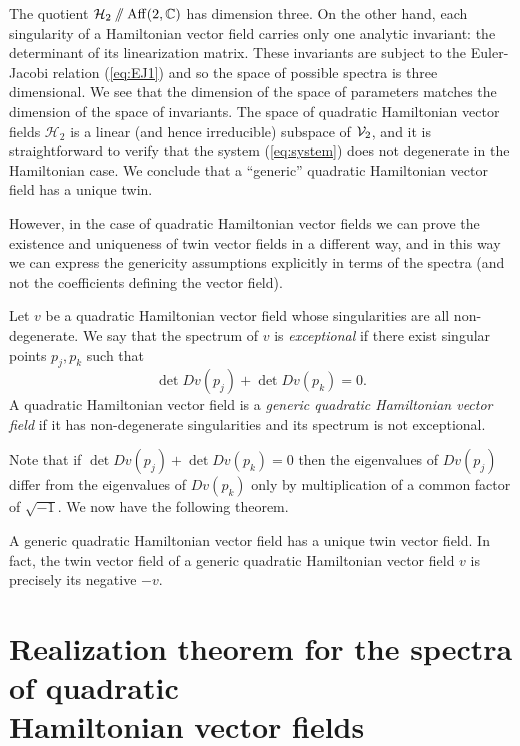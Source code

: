 \documentclass[phd,tocprelim]{cornell}
\begin{document}
The quotient $\mathcal{H}_2\sslash\operatorname{Aff}({2},{\mathbb{C}})$ has dimension three. On the other hand, each singularity of a Hamiltonian vector field carries only one analytic invariant: the determinant of its linearization matrix. These invariants are subject to the Euler-Jacobi relation (\ref{eq:EJ1}) and so the space of possible spectra is three dimensional. We see that the dimension of the space of parameters matches the dimension of the space of invariants. The space of quadratic Hamiltonian vector fields $\mathcal{H}_2$ is a linear (and hence irreducible) subspace of $\mathcal{V}_2$, and it is straightforward to verify that the system (\ref{eq:system}) does not degenerate in the Hamiltonian case. We conclude that a ``generic'' quadratic Hamiltonian vector field has a unique twin.

However, in the case of quadratic Hamiltonian vector fields we can prove the existence and uniqueness of twin vector fields in a different way, and in this way we can express the genericity assumptions explicitly in terms of the spectra (and not the coefficients defining the vector field).

\begin{definition}
Let $v$ be a quadratic Hamiltonian vector field whose singularities are all non-degenerate. We say that the spectrum of $v$ is \emph{exceptional} if there exist singular points $p_j,p_k$ such that
\[ \det{Dv(p_j)}+\det{Dv(p_k)}=0. \]
A quadratic Hamiltonian vector field is a \emph{generic quadratic Hamiltonian vector field} if it has non-degenerate singularities and its spectrum is not exceptional.
\end{definition}

Note that if $\det{Dv(p_j)}+\det{Dv(p_k)}=0$ then the eigenvalues of $Dv(p_j)$ differ from the eigenvalues of $Dv(p_k)$ only by multiplication of a common factor of $\sqrt{-1}$. We now have the following theorem.

\begin{theorem}\label{thm:twinHam}
A generic quadratic Hamiltonian vector field has a unique twin vector field. In fact, the twin vector field of a generic quadratic Hamiltonian vector field $v$ is precisely its negative $-v$.
\end{theorem}





\section{\texorpdfstring{Realization theorem for the spectra of quadratic\\Hamiltonian vector fields}{Realization theorem for the spectra of quadratic Hamiltonian vector fields}}
\end{document}

